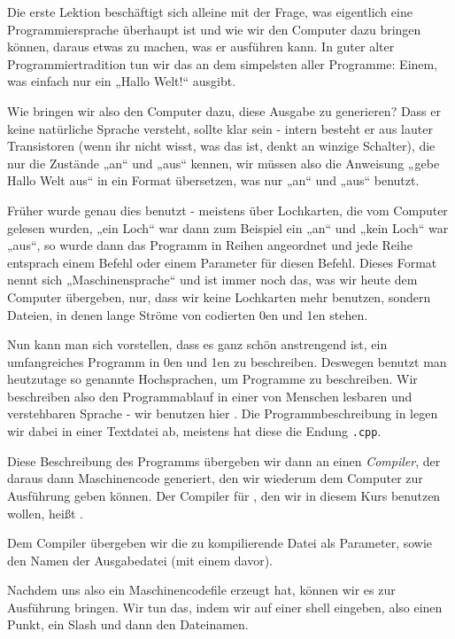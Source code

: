 
Die erste Lektion beschäftigt sich alleine mit der Frage, was eigentlich eine Programmiersprache überhaupt ist und wie wir den Computer dazu bringen können, daraus etwas zu machen, was er ausführen kann.
In guter alter Programmiertradition tun wir das an dem simpelsten aller Programme: Einem, was einfach nur ein „Hallo Welt!“ ausgibt.

Wie bringen wir also den Computer dazu, diese Ausgabe zu generieren? Dass er keine natürliche Sprache versteht, sollte klar sein - intern besteht er aus lauter Transistoren (wenn ihr nicht wisst, was das ist, denkt an winzige Schalter), die nur die Zustände „an“ und „aus“ kennen, wir müssen also die Anweisung „gebe Hallo Welt aus“ in ein Format übersetzen, was nur „an“ und „aus“ benutzt.

Früher wurde genau dies benutzt - meistens über Lochkarten, die vom Computer gelesen wurden, „ein Loch“ war dann zum Beispiel ein „an“ und „kein Loch“ war „aus“, so wurde dann das Programm in Reihen angeordnet und jede Reihe entsprach einem Befehl oder einem Parameter für diesen Befehl.
Dieses Format nennt sich „Maschinensprache“ und ist immer noch das, was wir heute dem Computer übergeben, nur, dass wir keine Lochkarten mehr benutzen, sondern Dateien, in denen lange Ströme von codierten 0en und 1en stehen.

Nun kann man sich vorstellen, dass es ganz schön anstrengend ist, ein umfangreiches Programm in 0en und 1en zu beschreiben. Deswegen benutzt man heutzutage so genannte Hochsprachen, um Programme zu beschreiben.
Wir beschreiben also den Programmablauf in einer von Menschen lesbaren und verstehbaren Sprache - wir benutzen hier \Cpp.
Die Programmbeschreibung in \Cpp legen wir dabei in einer Textdatei ab, meistens hat diese die Endung \texttt{.cpp}.

Diese Beschreibung des Programms übergeben wir dann an einen \emph{Compiler}, der daraus dann Maschinencode generiert, den wir wiederum dem Computer zur Ausführung geben können.
Der Compiler für \Cpp, den wir in diesem Kurs benutzen wollen, heißt .

Dem Compiler übergeben wir die zu kompilierende Datei als Parameter, sowie den Namen der Ausgabedatei (mit einem  davor).

Nachdem  uns also ein Maschinencodefile  erzeugt hat, können wir es zur Ausführung bringen. Wir tun das, indem wir auf einer shell  eingeben, also einen Punkt, ein Slash und dann den Dateinamen.

